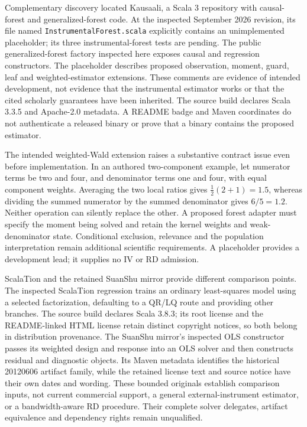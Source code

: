 Complementary discovery located Kausaali, a Scala 3 repository with causal-forest and generalized-forest code. At the inspected September 2026 revision, its file named \texttt{InstrumentalForest.scala} explicitly contains an unimplemented placeholder; its three instrumental-forest tests are pending. The public generalized-forest factory inspected here exposes causal and regression constructors. The placeholder describes proposed observation, moment, guard, leaf and weighted-estimator extensions. These comments are evidence of intended development, not evidence that the instrumental estimator works or that the cited scholarly guarantees have been inherited. The source build declares Scala 3.3.5 and Apache-2.0 metadata. A README badge and Maven coordinates do not authenticate a released binary or prove that a binary contains the proposed estimator.~\citep{exec25_javaiv_kausaali}

The intended weighted-Wald extension raises a substantive contract issue even before implementation. In an authored two-component example, let numerator terms be two and four, and denominator terms one and four, with equal component weights. Averaging the two local ratios gives $\tfrac12(2+1)=1.5$, whereas dividing the summed numerator by the summed denominator gives $6/5=1.2$. Neither operation can silently replace the other. A proposed forest adapter must specify the moment being solved and retain the kernel weights and weak-denominator state. Conditional exclusion, relevance and the population interpretation remain additional scientific requirements. A placeholder provides a development lead; it supplies no IV or RD admission.~\citep{exec25_javaiv_kausaali,exec25_javaiv_choice}

ScalaTion and the retained SuanShu mirror provide different comparison points. The inspected ScalaTion regression trains an ordinary least-squares model using a selected factorization, defaulting to a QR/LQ route and providing other branches. The source build declares Scala 3.8.3; its root license and the README-linked HTML license retain distinct copyright notices, so both belong in distribution provenance. The SuanShu mirror's inspected OLS constructor passes its weighted design and response into an OLS solver and then constructs residual and diagnostic objects. Its Maven metadata identifies the historical 20120606 artifact family, while the retained license text and source notice have their own dates and wording. These bounded originals establish comparison inputs, not current commercial support, a general external-instrument estimator, or a bandwidth-aware RD procedure. Their complete solver delegates, artifact equivalence and dependency rights remain unqualified.~\citep{exec25_javaiv_scalation,exec25_javaiv_suan}

